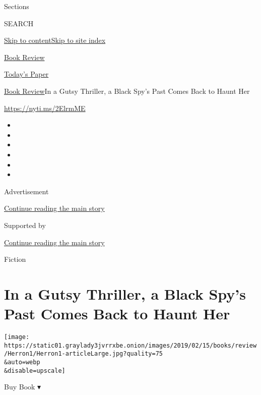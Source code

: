 Sections

SEARCH

\protect\hyperlink{site-content}{Skip to
content}\protect\hyperlink{site-index}{Skip to site index}

\href{https://www.nytimes3xbfgragh.onion/section/books/review}{Book
Review}

\href{https://myaccount.nytimes3xbfgragh.onion/auth/login?response_type=cookie\&client_id=vi}{}

\href{https://www.nytimes3xbfgragh.onion/section/todayspaper}{Today's
Paper}

\href{/section/books/review}{Book Review}\textbar{}In a Gutsy Thriller,
a Black Spy's Past Comes Back to Haunt Her

\url{https://nyti.ms/2ElrmME}

\begin{itemize}
\item
\item
\item
\item
\item
\item
\end{itemize}

Advertisement

\protect\hyperlink{after-top}{Continue reading the main story}

Supported by

\protect\hyperlink{after-sponsor}{Continue reading the main story}

Fiction

\hypertarget{in-a-gutsy-thriller-a-black-spys-past-comes-back-to-haunt-her}{%
\section{In a Gutsy Thriller, a Black Spy's Past Comes Back to Haunt
Her}\label{in-a-gutsy-thriller-a-black-spys-past-comes-back-to-haunt-her}}

\texttt{[image: https://static01.graylady3jvrrxbe.onion/images/2019/02/15/books/review/Herron1/Herron1-articleLarge.jpg?quality=75\\\&auto=webp\\\&disable=upscale]}

Buy Book ▾

